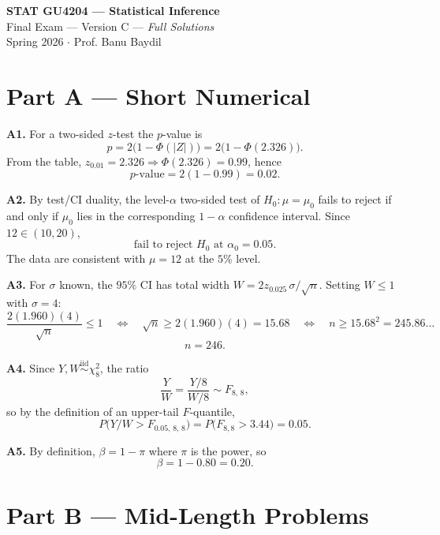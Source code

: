 \documentclass[11pt]{article}
\newcommand{\iid}{\stackrel{\text{iid}}{\sim}}
\begin{document}
\begin{center}
    {\large\textbf{STAT GU4204 --- Statistical Inference}}\\[2pt]
    {\normalsize Final Exam --- Version C --- \emph{Full Solutions}}\\[2pt]
    {\small Spring 2026 \quad $\cdot$ \quad Prof. Banu Baydil}
\end{center}

\vspace{1em}

\section*{Part A --- Short Numerical}

\textbf{A1.} For a two-sided $z$-test the $p$-value is
\[
p = 2\bigl(1 - \Phi(|Z|)\bigr) = 2\bigl(1 - \Phi(2.326)\bigr).
\]
From the table, $z_{0.01} = 2.326 \Rightarrow \Phi(2.326) = 0.99$, hence
\[
\boxed{p\text{-value} = 2(1 - 0.99) = 0.02.}
\]

\textbf{A2.} By test/CI duality, the level-$\alpha$ two-sided test of $H_0: \mu = \mu_0$ fails to reject if and only if $\mu_0$ lies in the corresponding $1-\alpha$ confidence interval. Since $12 \in (10, 20)$,
\[
\boxed{\text{fail to reject } H_0 \text{ at } \alpha_0 = 0.05.}
\]
The data are consistent with $\mu = 12$ at the $5\%$ level.

\textbf{A3.} For $\sigma$ known, the $95\%$ CI has total width $W = 2 z_{0.025}\, \sigma/\sqrt{n}$. Setting $W \le 1$ with $\sigma = 4$:
\[
\frac{2(1.960)(4)}{\sqrt{n}} \le 1
\quad\Longleftrightarrow\quad
\sqrt{n} \ge 2(1.960)(4) = 15.68
\quad\Longleftrightarrow\quad
n \ge 15.68^2 = 245.86\ldots
\]
\[
\boxed{n = 246.}
\]

\textbf{A4.} Since $Y, W \iid \chi^2_8$, the ratio
\[
\frac{Y}{W} = \frac{Y/8}{W/8} \sim F_{8,\,8},
\]
so by the definition of an upper-tail $F$-quantile,
\[
P\!\bigl(Y/W > F_{0.05,\,8,\,8}\bigr) = P\!\bigl(F_{8,8} > 3.44\bigr) = \boxed{0.05.}
\]

\textbf{A5.} By definition, $\beta = 1 - \pi$ where $\pi$ is the power, so
\[
\boxed{\beta = 1 - 0.80 = 0.20.}
\]

\section*{Part B --- Mid-Length Problems}
\end{document}
